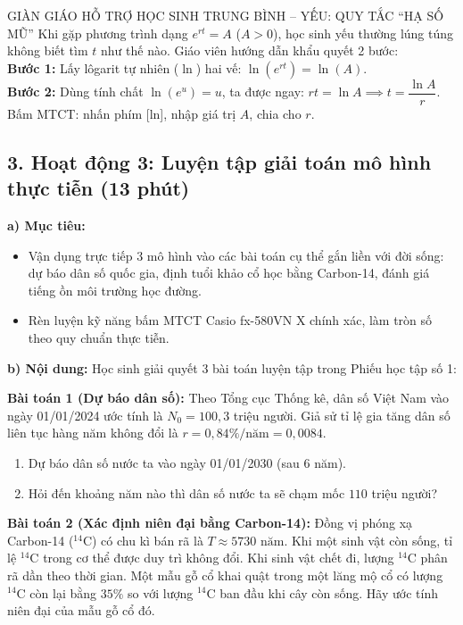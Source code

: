 \documentclass[12pt, a4paper]{article}
\begin{document}
\begin{scaffoldbox}{GIÀN GIÁO HỖ TRỢ HỌC SINH TRUNG BÌNH -- YẾU: QUY TẮC ``HẠ SỐ MŨ''}
Khi gặp phương trình dạng $e^{rt} = A$ ($A > 0$), học sinh yếu thường lúng túng không biết tìm $t$ như thế nào. Giáo viên hướng dẫn khẩu quyết 2 bước:\\
\textbf{Bước 1:} Lấy lôgarit tự nhiên ($\ln$) hai vế: $\ln(e^{rt}) = \ln(A)$.\\
\textbf{Bước 2:} Dùng tính chất $\ln(e^u) = u$, ta được ngay: $rt = \ln A \implies t = \dfrac{\ln A}{r}$. Bấm MTCT: nhấn phím [ln], nhập giá trị $A$, chia cho $r$.
\end{scaffoldbox}

\vspace{5pt}

\subsection*{3. Hoạt động 3: Luyện tập giải toán mô hình thực tiễn (13 phút)}

\noindent \textbf{a) Mục tiêu:}
\begin{itemize}[leftmargin=0.6cm]
    \item Vận dụng trực tiếp 3 mô hình vào các bài toán cụ thể gắn liền với đời sống: dự báo dân số quốc gia, định tuổi khảo cổ học bằng Carbon-14, đánh giá tiếng ồn môi trường học đường.
    \item Rèn luyện kỹ năng bấm MTCT Casio fx-580VN X chính xác, làm tròn số theo quy chuẩn thực tiễn.
\end{itemize}

\noindent \textbf{b) Nội dung:}
Học sinh giải quyết 3 bài toán luyện tập trong Phiếu học tập số 1:

\textbf{Bài toán 1 (Dự báo dân số):}
Theo Tổng cục Thống kê, dân số Việt Nam vào ngày 01/01/2024 ước tính là $N_0 = 100{,}3$ triệu người. Giả sử tỉ lệ gia tăng dân số liên tục hàng năm không đổi là $r = 0{,}84\%/\text{năm} = 0{,}0084$.
\begin{enumerate}[label=\alph*)]
    \item Dự báo dân số nước ta vào ngày 01/01/2030 (sau 6 năm).
    \item Hỏi đến khoảng năm nào thì dân số nước ta sẽ chạm mốc $110$ triệu người?
\end{enumerate}

\textbf{Bài toán 2 (Xác định niên đại bằng Carbon-14):}
Đồng vị phóng xạ Carbon-14 ($^{14}\text{C}$) có chu kì bán rã là $T \approx 5730\text{ năm}$. Khi một sinh vật còn sống, tỉ lệ $^{14}\text{C}$ trong cơ thể được duy trì không đổi. Khi sinh vật chết đi, lượng $^{14}\text{C}$ phân rã dần theo thời gian. Một mẫu gỗ cổ khai quật trong một lăng mộ cổ có lượng $^{14}\text{C}$ còn lại bằng $35\%$ so với lượng $^{14}\text{C}$ ban đầu khi cây còn sống. Hãy ước tính niên đại của mẫu gỗ cổ đó.
\end{document}

